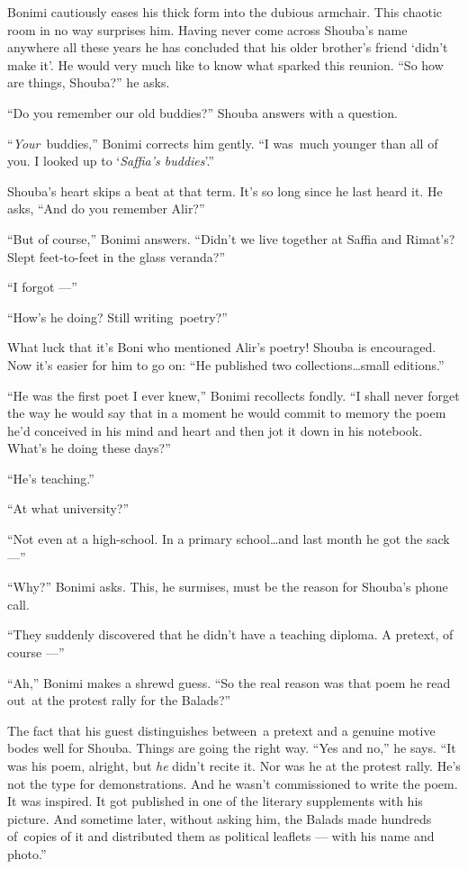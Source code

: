 \documentclass[twoside,11pt,openany]{book}
\begin{document}
Bonimi cautiously eases his thick form into the dubious armchair. This chaotic room in no way surprises him. Having
never come across Shouba's name anywhere all these years he has concluded that his older brother's friend `didn't
make it{}'. He would very much like to know what sparked this reunion. ``So how are things,
Shouba?'' he asks.

``Do you remember our old buddies?'' Shouba answers with a question.

``\textit{Your}~buddies,'' Bonimi corrects him gently. ``I was~much younger than all of you. I looked up to
`\textit{Saffia's buddies}'.''

Shouba's heart skips a beat at that term. It's so long since he last heard it. He asks, ``And do you
remember Alir?''

``But of course,'' Bonimi answers. ``Didn't we live together at Saffia and
Rimat's? Slept feet-to-feet in the glass veranda?''

``I forgot ---''

``How's he doing? Still writing~poetry?''

What luck that it's Boni who mentioned Alir's poetry! Shouba is encouraged. Now it's easier for him to go on:
``He published two collections{\ldots}small{ }editions.''

``He was the first poet I ever knew,'' Bonimi recollects fondly. ``I shall never
forget the way he would say that in a moment he would commit to memory the poem he'd conceived in his mind and heart
and then jot it down in his notebook. What's he doing these days?''

``He's teaching.''

``At what university?''

``Not even {at} a high-school.{  }{In a} primary
school{\ldots}and last month he got the sack ---''

``Why?'' Bonimi asks. This, he surmises, must be the reason for Shouba's phone call.

``They suddenly discovered that he didn't have a teaching diploma. A pretext, of course ---''

``Ah,'' Bonimi makes a shrewd guess. ``So the real reason was that poem he read
out~at the protest rally for the Balads?''

The fact that his guest distinguishes between~a pretext and a genuine motive bodes well for Shouba. Things are going the
right way. ``Yes and no,'' he says. ``It was his poem, alright, but \textit{he}
didn't recite it. Nor was he at the protest rally. He's not the type for demonstrations. And he wasn't commissioned to
write the poem. It was inspired. It got published in one of the literary supplements with his picture. And sometime
later, without asking him, the Balads made hundreds of~copies of it and distributed them as political leaflets ---
with his name and photo.''
\end{document}
